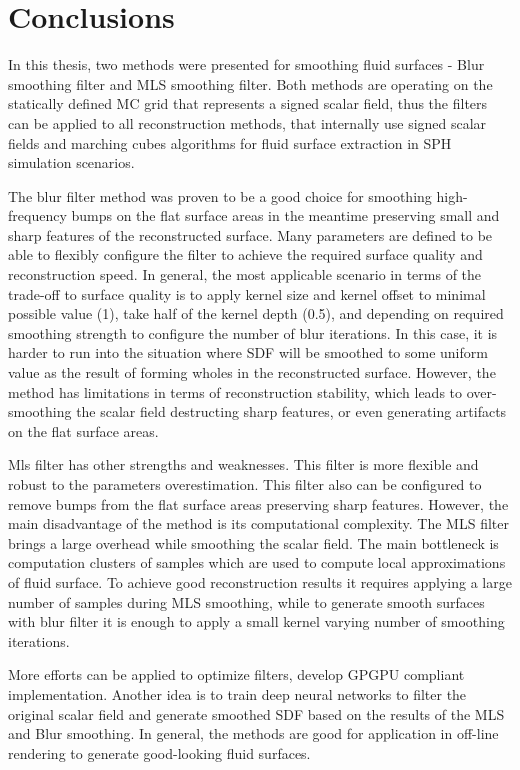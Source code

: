 \chapter{Conclusions}
In this thesis, two methods were presented for smoothing fluid surfaces - Blur smoothing filter and MLS smoothing filter. Both methods are operating on the statically defined MC grid that represents a signed scalar field, thus the filters can be applied to all reconstruction methods, that internally use signed scalar fields and marching cubes algorithms for fluid surface extraction in SPH simulation scenarios.

The blur filter method was proven to be a good choice for smoothing high-frequency bumps on the flat surface areas in the meantime preserving small and sharp features of the reconstructed surface. Many parameters are defined to be able to flexibly configure the filter to achieve the required surface quality and reconstruction speed. In general, the most applicable scenario in terms of the trade-off to surface quality is to apply kernel size and kernel offset to minimal possible value (1), take half of the kernel depth (0.5), and depending on required smoothing strength to configure the number of blur iterations. In this case, it is harder to run into the situation where SDF will be smoothed to some uniform value as the result of forming wholes in the reconstructed surface.
However, the method has limitations in terms of reconstruction stability, which leads to over-smoothing the scalar field destructing sharp features, or even generating artifacts on the flat surface areas.

Mls filter has other strengths and weaknesses. This filter is more flexible and robust to the parameters overestimation. This filter also can be configured to remove bumps from the flat surface areas preserving sharp features. However, the main disadvantage of the method is its computational complexity. The MLS filter brings a large overhead while smoothing the scalar field. The main bottleneck is computation clusters of samples which are used to compute local approximations of fluid surface. To achieve good reconstruction results it requires applying a large number of samples during MLS smoothing, while to generate smooth surfaces with blur filter it is enough to apply a small kernel varying number of smoothing iterations.

More efforts can be applied to optimize filters, develop GPGPU compliant implementation. Another idea is to train deep neural networks to filter the original scalar field and generate smoothed SDF based on the results of the MLS and Blur smoothing. In general, the methods are good for application in off-line rendering to generate good-looking fluid surfaces.